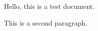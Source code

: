 \documentclass[10pt,portrait]{article}
\begin{document}
\small

\begin{multicols}{ 2 }
Hello, this is a test document.

This is a second paragraph.
\end{multicols}
\end{document}
